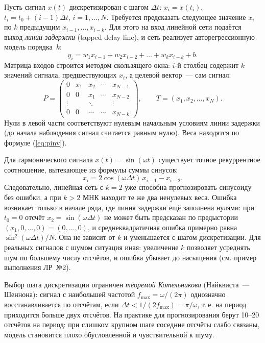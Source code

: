 Пусть сигнал $x(t)$ дискретизирован с шагом $\Delta t$: $x_i = x(t_i)$, $t_i = t_0 + (i - 1)\Delta t$,
$i = 1, \ldots, N$. Требуется предсказать
следующее значение $x_i$ по $k$ предыдущим $x_{i-1}, \ldots, x_{i-k}$. Для этого на вход линейной сети
подаётся выход \emph{линии задержки} (tapped delay line), и сеть реализует авторегрессионную модель
порядка~$k$:
\begin{equation}
\label{eq:ar}
y_i = w_1 x_{i-1} + w_2 x_{i-2} + \ldots + w_k x_{i-k} + b .
\end{equation}
Матрица входов строится методом скользящего окна: $i$-й столбец содержит $k$ значений сигнала,
предшествующих $x_i$, а целевой вектор~--- сам сигнал:
\begin{equation}
\label{eq:delay-matrix}
P = \begin{pmatrix}
0 & x_1 & x_2 & \cdots & x_{N-1}\\
0 & 0 & x_1 & \cdots & x_{N-2}\\
\vdots & & \ddots & & \vdots\\
0 & 0 & \cdots & \cdots & x_{N-k}
\end{pmatrix}, \qquad T = (x_1, x_2, \ldots, x_N).
\end{equation}
Нули в левой части соответствуют нулевым начальным условиям линии задержки (до начала наблюдения
сигнал считается равным нулю). Веса находятся по формуле (\ref{eq:pinv}).

Для гармонического сигнала $x(t) = \sin(\omega t)$ существует точное рекуррентное соотношение,
вытекающее из формулы суммы синусов:
\begin{equation}
\label{eq:harmonic}
x_i = 2\cos(\omega\Delta t)\, x_{i-1} - x_{i-2}.
\end{equation}
Следовательно, линейная сеть с $k = 2$ уже способна прогнозировать синусоиду без ошибки, а при $k > 2$
МНК находит те же два ненулевых веса. Ошибка возникает только в начале ряда, где линия задержки ещё
заполнена нулями: при $t_0 = 0$ отсчёт $x_2 = \sin(\omega\Delta t)$ не может быть предсказан по
предыстории $(x_1, 0, \ldots, 0) = (0, \ldots, 0)$, и среднеквадратичная ошибка примерно равна $\sin^2(\omega\Delta t)/N$. Она не
зависит от $k$ и уменьшается с шагом дискретизации. Для реальных сигналов с шумом ситуация иная:
увеличение $k$ позволяет усреднять шум по большему числу отсчётов, и ошибка убывает до насыщения
(см. пример выполнения ЛР~№2).

Выбор шага дискретизации ограничен \emph{теоремой Котельникова} (Найквиста~--- Шеннона): сигнал с
наибольшей частотой $f_{\max} = \omega/(2\pi)$ однозначно восстанавливается по отсчётам, если
$\Delta t < 1/(2 f_{\max}) = \pi/\omega$, т.\,е. на период приходится больше двух отсчётов. На практике
для прогнозирования берут 10--20 отсчётов на период: при слишком крупном шаге соседние отсчёты слабо
связаны, модель становится плохо обусловленной и чувствительной к шуму.

